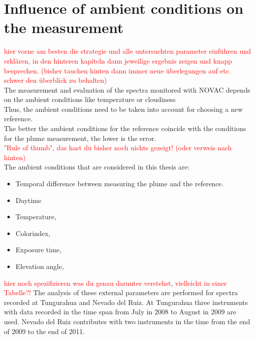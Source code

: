 \section{Influence of ambient conditions on the measurement \label{Chap:BROErr}}
\textcolor{red}{hier vorne am besten die strategie und alle untersuchten parameter einführen und erklären, in den hinteren kapiteln dann jeweilige ergebnis zeigen und knapp besprechen. (bisher tauchen hinten dann immer neue überlegungen auf etc. schwer den überblick zu behalten) }\\


The measurement and evaluation of the spectra monitored with NOVAC depends on the ambient conditions like temperature or cloudiness \citep{lubcke2014optical}\\
Thus, the ambient conditions need to be taken into account for choosing a new reference.\\

The better the ambient conditions for the reference coincide with the conditions for the plume measurement, the lower is the  error. \\\textcolor{red}{"Rule of thumb", das hast du bisher noch nichts gezeigt! (oder verweis nach hinten)}
	\\
The ambient conditions that are considered in this thesis are: 
	\begin{itemize}
		\item Temporal difference between measuring the plume and the reference.	
		\item Daytime 
		\item Temperature, 
		\item Colorindex, 
		\item Exposure time, 
		\item Elevation angle, 
		
	\end{itemize}
\textcolor{red}{hier noch spezifizieren was du genau darunter verstehst, vielleicht in einer Tabelle?!}
The analysis of these external parameters are performed for spectra recorded at Tungurahua and Nevado del Ruiz. At Tungurahua three instruments with data recorded in the time span from July in 2008 to August in 2009 are used. Nevado del Ruiz contributes with two instruments in the time from the end of 2009 to the end of 2011.
%	

